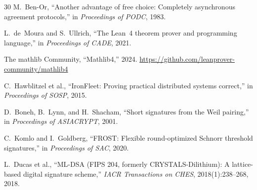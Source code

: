 \begin{thebibliography}{30}
M.~Ben-Or, ``Another advantage of free choice: Completely asynchronous agreement
protocols,'' in \textit{Proceedings of PODC}, 1983.

L.~de~Moura and S.~Ullrich, ``The Lean~4 theorem prover and programming language,''
in \textit{Proceedings of CADE}, 2021.

The mathlib Community, ``Mathlib4,'' 2024.
\url{https://github.com/leanprover-community/mathlib4}

C.~Hawblitzel et al., ``IronFleet: Proving practical distributed systems correct,''
in \textit{Proceedings of SOSP}, 2015.

D.~Boneh, B.~Lynn, and H.~Shacham, ``Short signatures from the Weil pairing,''
in \textit{Proceedings of ASIACRYPT}, 2001.

C.~Komlo and I.~Goldberg, ``FROST: Flexible round-optimized Schnorr threshold
signatures,'' in \textit{Proceedings of SAC}, 2020.

L.~Ducas et al., ``ML-DSA (FIPS 204, formerly CRYSTALS-Dilithium): A lattice-based digital signature scheme,''
\textit{IACR Transactions on CHES}, 2018(1):238--268, 2018.

\end{thebibliography}

